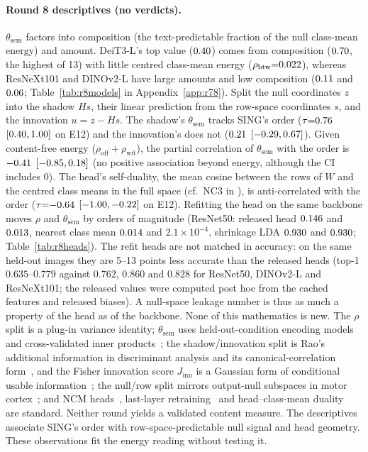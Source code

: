 \documentclass[10pt]{article}
\begin{document}
\paragraph{Round 8 descriptives (no verdicts).}
$\theta_{\mathrm{sem}}$ factors into composition (the text-predictable fraction of the null class-mean energy) and amount. DeiT3-L's top value ($0.40$) comes from composition ($0.70$, the highest of 13) with little centred class-mean energy ($\rho_{\mathrm{btw}}{=}0.022$), whereas ResNeXt101 and DINOv2-L have large amounts and low composition ($0.11$ and $0.06$; Table~\ref{tab:r8models} in Appendix~\ref{app:r78}).
Split the null coordinates $z$ into the shadow $Hs$, their linear prediction from the row-space coordinates $s$, and the innovation $u=z-Hs$. The shadow's $\theta_{\mathrm{sem}}$ tracks SING's order ($\tau{=}0.76$ $[0.40,1.00]$ on E12) and the innovation's does not ($0.21$ $[{-}0.29,0.67]$). Given content-free energy ($\rho_{\mathrm{off}}+\rho_{\mathrm{wit}}$), the partial correlation of $\theta_{\mathrm{sem}}$ with the order is ${-}0.41$ $[{-}0.85,0.18]$ (no positive association beyond energy, although the CI includes 0).
The head's self-duality, the mean cosine between the rows of $W$ and the centred class means in the full space (cf.\ NC3 in \citealp{papyan2020collapse}), is anti-correlated with the order ($\tau{=}{-}0.64$ $[{-}1.00,{-}0.22]$ on E12).
Refitting the head on the same backbone moves $\rho$ and $\theta_{\mathrm{sem}}$ by orders of magnitude (ResNet50: released head $0.146$ and $0.013$, nearest class mean $0.014$ and $2.1{\times}10^{-4}$, shrinkage LDA $0.930$ and $0.930$; Table~\ref{tab:r8heads}). The refit heads are not matched in accuracy: on the same held-out images they are 5--13 points less accurate than the released heads (top-1 $0.635$--$0.779$ against $0.762$, $0.860$ and $0.828$ for ResNet50, DINOv2-L and ResNeXt101; the released values were computed post hoc from the cached features and released biases). A null-space leakage number is thus as much a property of the head as of the backbone.
None of this mathematics is new. The $\rho$ split is a plug-in variance identity; $\theta_{\mathrm{sem}}$ uses held-out-condition encoding models and cross-validated inner products~\citep{diedrichsen2017representational,diedrichsen2016crossnobis,diedrichsen2018pcm,walther2016reliability}; the shadow/innovation split is Rao's additional information in discriminant analysis and its canonical-correlation form~\citep{rao1946discriminant,rao1948utilization,fujikoshi1982additional}, and the Fisher innovation score $J_{\mathrm{inn}}$ is a Gaussian form of conditional usable information~\citep{hewitt2021conditional}; the null/row split mirrors output-null subspaces in motor cortex~\citep{kaufman2014nullspace}; and NCM heads~\citep{mensink2013ncm}, last-layer retraining~\citep{kirichenko2023dfr} and head--class-mean duality~\citep{papyan2020collapse} are standard.
Neither round yields a validated content measure. The descriptives associate SING's order with row-space-predictable null signal and head geometry. These observations fit the energy reading without testing it.
\end{document}
